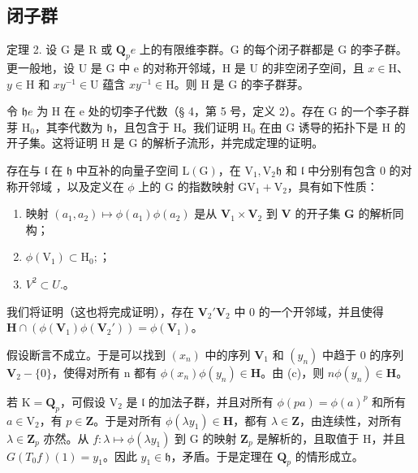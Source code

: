 \subsection{闭子群}

定理 2. 设 G 是 R 或 \(\mathbf{Q}_{p}\)\(e\) 上的有限维李群。G 的每个闭子群都是 G 的李子群。更一般地，设 U 是 G 中 e 的对称开邻域，H 是 U 的非空闭子空间，且 \(x \in \mathrm{H}\)、\(y \in \mathrm{H}\) 和 \(xy^{-1} \in \mathrm{U}\) 蕴含 \(xy^{-1} \in \mathrm{H}\)。则 H 是 G 的李子群芽。

令 \(\mathfrak{h}\)\(e\) 为 H 在 e 处的切李子代数（§ 4，第 5 号，定义 2）。存在 G 的一个李子群芽 \(\mathrm{H}_0\)，其李代数为 \(\mathfrak{h}\)，且包含于 H。我们证明 \(\mathrm{H}_0\) 在由 G 诱导的拓扑下是 H 的开子集。这将证明 H 是 G 的解析子流形，并完成定理的证明。

存在与 \(\mathfrak{l}\) 在 \(\mathfrak{h}\) 中互补的向量子空间 \(\mathrm{L}(\mathrm{G})\)，在 \(\mathrm{V}_1, \mathrm{V}_2\)\(\mathfrak{h}\) 和 \(\mathfrak{l}\) 中分别有包含 0 的对称开邻域 ，以及定义在 \(\phi\) 上的 G 的指数映射 \(\mathrm{G}\)\(\mathrm{V}_1 + \mathrm{V}_2\)，具有如下性质：

\begin{enumerate}
\def\labelenumi{(\alph{enumi})}
\item
  映射 \((a_{1}, a_{2}) \mapsto \phi(a_{1})\phi(a_{2})\) 是从 \(\mathbf{V}_{1} \times \mathbf{V}_{2}\) 到 \(\mathbf{V}\) 的开子集 \(\mathbf{G}\) 的解析同构；
\item
  \(\phi (\mathrm{V}_1)\subset \mathrm{H}_0;\)；
\item
  \(V^{2} \subset U.\)。
\end{enumerate}

我们将证明（这也将完成证明），存在 \(\mathbf{V}_2'\)\(\mathbf{V}_2\) 中 0 的一个开邻域，并且使得 \(\mathbf{H} \cap (\phi(\mathbf{V}_1)\phi(\mathbf{V}_2')) = \phi(\mathbf{V}_1)\)。

假设断言不成立。于是可以找到 \((x_{n})\) 中的序列 \(\mathbf{V}_1\) 和 \((y_{n})\) 中趋于 0 的序列 \(\mathbf{V}_2 - \{0\}\)，使得对所有 n 都有 \(\phi (x_n)\phi (y_n)\in \mathbf{H}\)。由 (c)，则 \(n\)\(\phi (y_n)\in \mathbf{H}\)。

若 \(\mathrm{K} = \mathbf{Q}_p\)，可假设 \(\mathrm{V}_2\) 是 \(\mathfrak{l}\) 的加法子群，并且对所有 \(\phi (pa) = \phi (a)^p\) 和所有 \(a\in \mathrm{V}_2\)，有 \(p\in \mathbf{Z}\)。于是对所有 \(\phi (\lambda y_1)\in \mathbf{H}\)，都有 \(\lambda \in \mathbf{Z}\)，由连续性，对所有 \(\lambda \in \mathbf{Z}_p\) 亦然。从 \(f\colon \lambda \mapsto \phi (\lambda y_1)\) 到 G 的映射 \(\mathbf{Z}_p\) 是解析的，且取值于 H，并且 \(G\)\((T_0f)(1) = y_1\)。因此 \(y_{1}\in \mathfrak{h}\)，矛盾。于是定理在 \(\mathbf{Q}_p\) 的情形成立。

